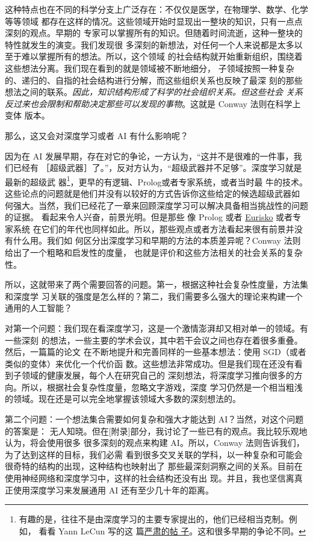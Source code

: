 这种特点也在不同的科学分支上广泛存在：不仅仅是医学，在物理学、数学、化学等等领域
都存在这样的情况。这些领域开始时显现出一整块的知识，只有一点点深刻的观点。早期的
专家可以掌握所有的知识。但随着时间流逝，这种一整块的特性就发生的演变。我们发现很
多深刻的新想法，对任何一个人来说都是太多以至于难以掌握所有的想法。所以，这个领域
的社会结构就开始重新组织，围绕着这些想法分离。我们现在看到的就是领域被不断地细分，
子领域按照一种复杂的、递归的、自指的社会结构进行分解，而这些组织关系也反映了最深
刻的那些想法之间的联系。\emph{因此，知识结构形成了科学的社会组织关系。但这些社会
  关系反过来也会限制和帮助决定那些可以发现的事物}。这就是 Conway 法则在科学上变体
版本。

那么，这又会对深度学习或者 AI 有什么影响呢？

因为在 AI 发展早期，存在对它的争论，一方认为，“这并不是很难的一件事，我们已经有
［超级武器］了。”，反对方认为，“超级武器并不足够”。深度学习就是最新的超级武
器\footnote{有趣的是，往往不是由深度学习的主要专家提出的，他们已经相当克制。例如，
  看看 Yann LeCun 写的这
  篇\href{https://www.facebook.com/yann.lecun/posts/10152348155137143}{严肃的帖
    子}。这和很多早期的争论不同。}，更早的有逻辑、Prolog或者专家系统，或者当时最
牛的技术。这些论点的问题就是他们并没有以较好的方式告诉你这些给定的候选超级武器如
何强大。当然，我们已经花了一章来回顾深度学习可以解决具备相当挑战性的问题的证据。
看起来令人兴奋，前景光明。但是那些
像 Prolog 或者 \href{http://en.wikipedia.org/wiki/Eurisko}{Eurisko} 或者专家系统
在它们的年代也同样如此。所以，那些观点或者方法看起来很有前景并没有什么用。我们如
何区分出深度学习和早期的方法的本质差异呢？Conway 法则给出了一个粗略和启发性的度量，
也就是评价和这些方法相关的社会关系的复杂性。

所以，这就带来了两个需要回答的问题。第一，根据这种社会复杂性度量，方法集和深度学
习关联的强度是怎么样的？第二，我们需要多么强大的理论来构建一个通用的人工智能？

对第一个问题：我们现在看深度学习，这是一个激情澎湃却又相对单一的领域。有一些深刻
的想法，一些主要的学术会议，其中若干会议之间也存在着很多重叠。然后，一篇篇的论文
在不断地提升和完善同样的一些基本想法：使用 SGD（或者类似的变体）来优化一个代价函
数。这些想法非常成功。但是我们现在还没有看到子领域的健康发展，每个人在研究自己的
深刻想法，将深度学习推向很多的方向。所以，根据社会复杂性度量，忽略文字游戏，深度
学习仍然是一个相当粗浅的领域。现在还是可以完全地掌握该领域大多数的深刻想法的。

第二个问题：一个想法集合需要如何复杂和强大才能达到 AI？当然，对这个问题的答案是：
无人知晓。但在[附录]部分，我讨论了一些已有的观点。我比较乐观地认为，将会使用很多
很多深刻的观点来构建 AI。所以，Conway 法则告诉我们，为了达到这样的目标，我们必需
看到很多交叉关联的学科，以一种复杂和可能会很奇特的结构的出现，这种结构也映射出了
那些最深刻洞察之间的关系。目前在使用神经网络和深度学习中，这样的社会结构还没有出
现。并且，我也坚信离真正使用深度学习来发展通用 AI 还有至少几十年的距离。

